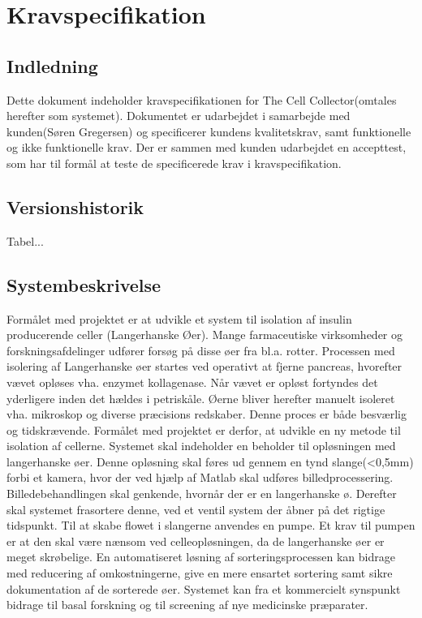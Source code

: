 \chapter{Kravspecifikation}

\section{Indledning}
Dette dokument indeholder kravspecifikationen for The Cell Collector(omtales herefter som systemet). Dokumentet er udarbejdet i samarbejde med kunden(Søren Gregersen) og specificerer kundens kvalitetskrav, samt funktionelle og ikke funktionelle krav. Der er sammen med kunden udarbejdet en accepttest, som har til formål at teste de specificerede krav i kravspecifikation.
\section{Versionshistorik}



Tabel...
\newpage
\section{Systembeskrivelse}
Formålet med projektet er at udvikle et system til isolation af insulin producerende celler (Langerhanske Øer). Mange farmaceutiske virksomheder og forskningsafdelinger udfører forsøg på disse øer fra bl.a. rotter. Processen med isolering af Langerhanske øer startes ved operativt at fjerne pancreas, hvorefter vævet opløses vha. enzymet kollagenase. Når vævet er opløst fortyndes det yderligere inden det hældes i petriskåle. Øerne bliver herefter manuelt isoleret vha. mikroskop og diverse præcisions redskaber. Denne proces er både besværlig og tidskrævende. Formålet med projektet er derfor, at udvikle en ny metode til isolation af cellerne. Systemet skal indeholder en beholder til opløsningen med langerhanske øer. Denne opløsning skal føres ud gennem en tynd slange(<0,5mm)  forbi et kamera, hvor der ved hjælp af Matlab skal udføres billedprocessering. Billedebehandlingen skal genkende, hvornår der er en langerhanske ø. Derefter skal systemet frasortere denne, ved et ventil system der åbner på det rigtige tidspunkt. Til at skabe flowet i slangerne anvendes en pumpe.  Et krav til pumpen er at den skal være nænsom ved celleopløsningen, da de langerhanske øer er meget skrøbelige.
En automatiseret løsning af sorteringsprocessen kan bidrage med reducering af omkostningerne, give en mere ensartet sortering samt sikre dokumentation af de sorterede øer. Systemet kan fra et kommercielt synspunkt bidrage til basal forskning og til screening af nye medicinske præparater.

